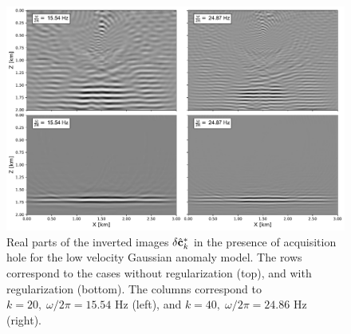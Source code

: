 \begin{figure}[h]
\centering
\includegraphics[width=\linewidth]{Fig/hole-inverted-images-comparison.pdf}

\vspace*{-0.4cm}
\caption{Real parts of the inverted images $\delta \hat{\mathbf{c}}^{\ast}_k$ in the presence of acquisition hole for the low velocity Gaussian anomaly model. The rows correspond to the cases without regularization (top), and with regularization (bottom). The columns correspond to $k = 20,\; \omega / 2 \pi = 15.54$ Hz (left), and $k = 40,\; \omega / 2 \pi = 24.86$ Hz (right).}
\label{fig:example2_image_comp}
\end{figure}